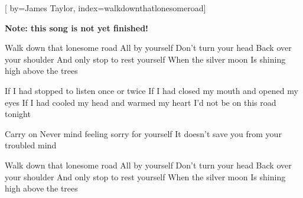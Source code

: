 
[%
    by={James Taylor},
    index={walkdownthatlonesomeroad}]


    \label{walkdownthatlonesomeroad}

    \textbf{Note: this song is not yet finished!}

    \beginchorus
        Walk down that lonesome road
        All by yourself
        Don't turn your head
        Back over your shoulder
        And only stop to rest yourself
        When the silver moon
        Is shining high above the trees
    \endchorus

    \beginverse
        If I had stopped to listen once or twice
        If I had closed my mouth and opened my eyes
        If I had cooled my head and warmed my heart
        I'd not be on this road tonight
    \endverse

    \beginverse*
        Carry on 
        Never mind feeling sorry for yourself
        It doesn't save you from your troubled mind
    \endverse

    \beginchorus
        Walk down that lonesome road
        All by yourself
        Don't turn your head
        Back over your shoulder
        And only stop to rest yourself
        When the silver moon
        Is shining high above the trees
    \endchorus
\endsong
